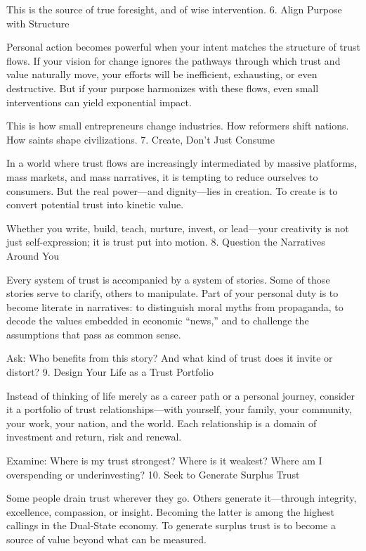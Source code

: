 \documentclass[11pt,oneside]{book}
\begin{document}
This is the source of true foresight, and of wise intervention.
6. Align Purpose with Structure

Personal action becomes powerful when your intent matches the structure of trust flows. If your vision for change ignores the pathways through which trust and value naturally move, your efforts will be inefficient, exhausting, or even destructive. But if your purpose harmonizes with these flows, even small interventions can yield exponential impact.

This is how small entrepreneurs change industries. How reformers shift nations. How saints shape civilizations.
7. Create, Don’t Just Consume

In a world where trust flows are increasingly intermediated by massive platforms, mass markets, and mass narratives, it is tempting to reduce ourselves to consumers. But the real power—and dignity—lies in creation. To create is to convert potential trust into kinetic value.

Whether you write, build, teach, nurture, invest, or lead—your creativity is not just self-expression; it is trust put into motion.
8. Question the Narratives Around You

Every system of trust is accompanied by a system of stories. Some of those stories serve to clarify, others to manipulate. Part of your personal duty is to become literate in narratives: to distinguish moral myths from propaganda, to decode the values embedded in economic “news,” and to challenge the assumptions that pass as common sense.

Ask: Who benefits from this story? And what kind of trust does it invite or distort?
9. Design Your Life as a Trust Portfolio

Instead of thinking of life merely as a career path or a personal journey, consider it a portfolio of trust relationships—with yourself, your family, your community, your work, your nation, and the world. Each relationship is a domain of investment and return, risk and renewal.

Examine: Where is my trust strongest? Where is it weakest? Where am I overspending or underinvesting?
10. Seek to Generate Surplus Trust

Some people drain trust wherever they go. Others generate it—through integrity, excellence, compassion, or insight. Becoming the latter is among the highest callings in the Dual-State economy. To generate surplus trust is to become a source of value beyond what can be measured.
\end{document}
